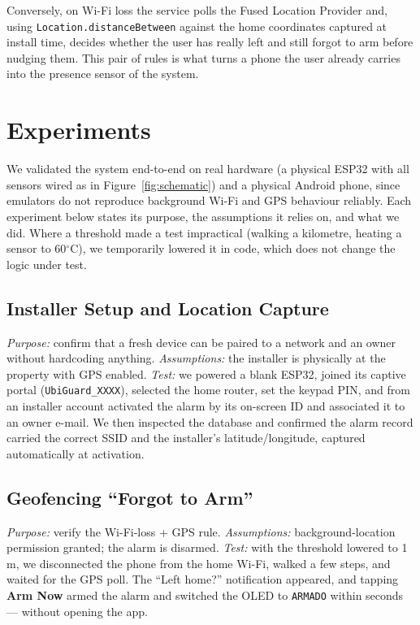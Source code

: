 \documentclass[10pt,twocolumn]{article}
\begin{document}
Conversely, on Wi-Fi loss the service polls the Fused Location Provider and, using \texttt{Location.distanceBetween} against the home coordinates captured at install time, decides whether the user has really left and still forgot to arm before nudging them. This pair of rules is what turns a phone the user already carries into the presence sensor of the system.

\section{Experiments}
We validated the system end-to-end on real hardware (a physical ESP32 with all sensors wired as in Figure~\ref{fig:schematic}) and a physical Android phone, since emulators do not reproduce background Wi-Fi and GPS behaviour reliably. Each experiment below states its purpose, the assumptions it relies on, and what we did. Where a threshold made a test impractical (walking a kilometre, heating a sensor to 60$^{\circ}$C), we temporarily lowered it in code, which does not change the logic under test.

\subsection{Installer Setup and Location Capture}
\emph{Purpose:} confirm that a fresh device can be paired to a network and an owner without hardcoding anything. \emph{Assumptions:} the installer is physically at the property with GPS enabled. \emph{Test:} we powered a blank ESP32, joined its captive portal (\texttt{UbiGuard\_XXXX}), selected the home router, set the keypad PIN, and from an installer account activated the alarm by its on-screen ID and associated it to an owner e-mail. We then inspected the database and confirmed the alarm record carried the correct SSID and the installer's latitude/longitude, captured automatically at activation.

\subsection{Geofencing ``Forgot to Arm''}
\emph{Purpose:} verify the Wi-Fi-loss + GPS rule. \emph{Assumptions:} background-location permission granted; the alarm is disarmed. \emph{Test:} with the threshold lowered to 1\,m, we disconnected the phone from the home Wi-Fi, walked a few steps, and waited for the GPS poll. The ``Left home?'' notification appeared, and tapping \textbf{Arm Now} armed the alarm and switched the OLED to \texttt{ARMADO} within seconds --- without opening the app.
\end{document}
